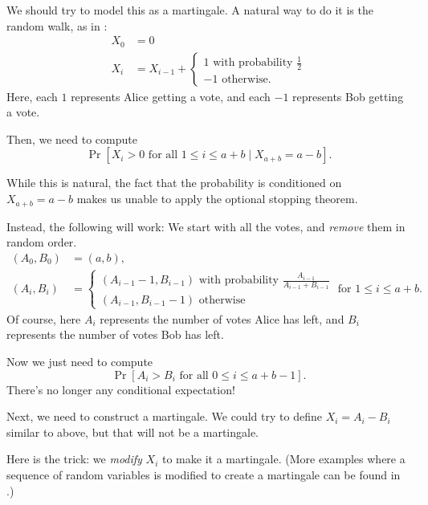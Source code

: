 We should try to model this as a martingale.
A natural way to do it is the random walk, as in :
\begin{align*}
	X_0 &= 0 \\
	X_i &= X_{i-1} +
	\begin{cases}
		1\text{ with probability }\frac{1}{2} \\
		-1\text{ otherwise.}
	\end{cases}
\end{align*}
Here, each $1$ represents Alice getting a vote, and each $-1$ represents Bob getting a vote.

Then, we need to compute
\[ \Pr[X_i > 0\text{ for all }1 \leq i \leq a+b \mid X_{a+b} = a-b]. \]

While this is natural, the fact that the probability is conditioned on $X_{a+b}=a-b$ makes us unable
to apply the optional stopping theorem.

Instead, the following will work:
We start with all the votes, and \emph{remove} them in random order.
\begin{align*}
	(A_0, B_0) &= (a, b), \\
	(A_i, B_i) &=
	\begin{cases}
		(A_{i-1}-1, B_{i-1})\text{ with probability }\frac{A_{i-1}}{A_{i-1}+B_{i-1}} \\
		(A_{i-1}, B_{i-1}-1)\text{ otherwise}
	\end{cases}
	\text{ for }1 \leq i \leq a+b.
\end{align*}
Of course, here $A_i$ represents the number of votes Alice has left,
and $B_i$ represents the number of votes Bob has left.

Now we just need to compute
\[ \Pr[A_i>B_i\text{ for all }0 \leq i \leq a+b-1]. \]
There's no longer any conditional expectation!

Next, we need to construct a martingale.
We could try to define $X_i = A_i-B_i$ similar to above, but that will not be a martingale.

Here is the trick: we \emph{modify} $X_i$ to make it a martingale. (More examples where a sequence
of random variables is modified to create a martingale can be found in .)

